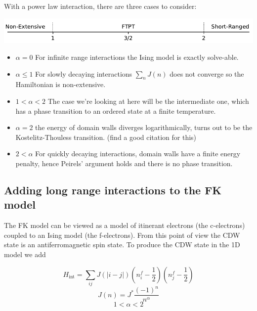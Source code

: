\documentclass[a4paper, 11pt, onecolumn]{article}
\begin{document}
With a power law interaction, there are three cases to consider:

\newline
\begin{center}
    \includegraphics[width=\textwidth]{alpha_diagram}
\end{center}

\newline

\begin{itemize}
    \item \( \alpha = 0\) For infinite range interactions the Ising model is exactly solve-able.
    \item \( \alpha \le 1\) For slowly decaying interactions $\sum_n J(n)$ does not converge so the Hamiltonian is non-extensive.
    \item \( 1 < \alpha < 2 \)  The case we're looking at here will be the intermediate one, which has a phase transition to an ordered state at a finite temperature.
    \item \( \alpha = 2 \) the energy of domain walls diverges logarithmically, turns out to be the Kostelitz-Thouless transition. (find a good citation for this)
    \item \( 2 < \alpha \) For quickly decaying interactions, domain walls have a finite energy penalty, hence Peirels' argument holds and there is no phase transition.


\end{itemize}

\subsection{Adding long range interactions to the FK model}

The FK model can be viewed as a model of itinerant electrons (the c-electrons) coupled to an Ising model (the f-electrons). From this point of view the CDW state is an antiferromagnetic spin state. To produce the CDW state in the 1D model we add 

  \begin{equation*}
    H_{\textrm{int}} = \sum_{ij} J\left(|i-j|\right) \left( n^f_i - \frac{1}{2} \right) \left( n^f_j - \frac{1}{2} \right)
  \end{equation*}
  \begin{equation*}
  J(n) = J^* \frac{(-1)^n}{ n^{\alpha} }
  \end{equation*}
  \begin{equation*}
    1 < \alpha < 2
  \end{equation*}
\end{document}

